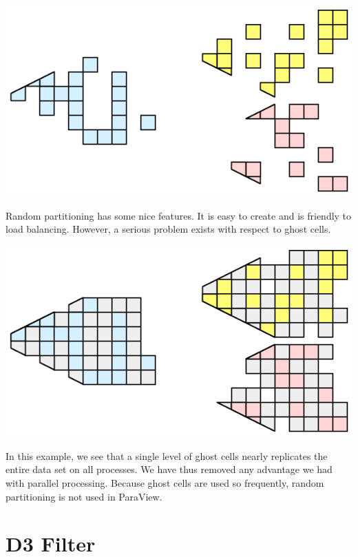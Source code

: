 \begin{inlinefig}
  \includegraphics[scale=\bbscale]{images/ParallelExampleRandomPartition1}
\end{inlinefig}

Random partitioning has some nice features.  It is easy to create and is
friendly to load balancing.  However, a serious problem exists with respect
to ghost cells.

\begin{inlinefig}
  \includegraphics[scale=\bbscale]{images/ParallelExampleRandomPartition2}
\end{inlinefig}

In this example, we see that a single level of ghost cells nearly
replicates the entire data set on all processes.  We have thus removed any
advantage we had with parallel processing.  Because ghost cells are used so
frequently, random partitioning is not used in ParaView.

\section{D3 Filter}

